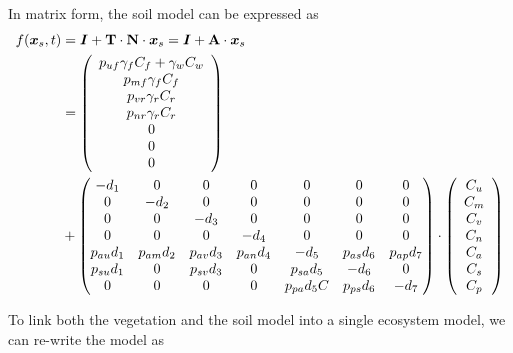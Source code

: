 \documentclass[11pt,a4paper]{article}
\begin{document}
In matrix form, the soil model can be expressed as 
\begin{align}
f({\bm x_s}, t) &=  {\bm I} + {\bf T} \cdot {\bf N} \cdot {\bm x_s} ={\bm I} + {\bf A} \cdot {\bm x_s} \notag \\
&= \left( \begin{array}{c} 
	 p_{uf} \gamma_f C_f + \gamma_w C_w \\
	 p_{mf} \gamma_f C_f \\
	 p_{vr} \gamma_r C_r \\
	 p_{nr} \gamma_r C_r \\
	 0 \\ 0 \\ 0
	\end{array} \right) \notag \\
&+ \left( \begin{matrix}
	-d_1 & 0 & 0 & 0 & 0 & 0 & 0 \\
	0 & -d_2 & 0 & 0 & 0 & 0 & 0 \\
	0 & 0 & -d_3 & 0 & 0 & 0 & 0 \\
	0 & 0 & 0 & -d_4 & 0 & 0 & 0 \\
	p_{au} d_1 & p_{am} d_2 & p_{av} d_3 & p_{an} d_4 & -d_5 &  p_{as} d_6 & p_{ap} d_7 \\
	p_{su} d_1 & 0 & p_{sv} d_3 & 0 & p_{sa} d_5 & -d_6 & 0 \\
	0 & 0 & 0 & 0 & p_{pa} d_5 C & p_{ps} d_6 & -d_7
	\end{matrix} \right)
\cdot \left( \begin{array}{c} C_u \\ C_m \\ C_v \\ C_n \\ C_a \\ C_s \\ C_p \end{array}\right)
\end{align}

To link both the vegetation and the soil model into a single ecosystem model, we can re-write the model as 
\end{document}
